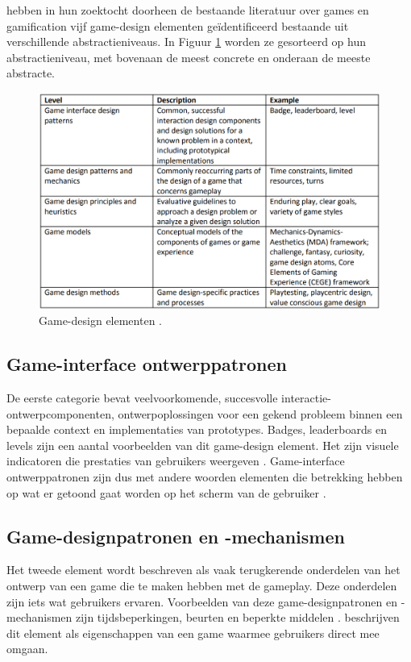 \textcite{Deterding20112} hebben in hun zoektocht doorheen de bestaande literatuur over games en gamification vijf game-design elementen geïdentificeerd bestaande uit verschillende abstractieniveaus. In Figuur \ref{fig:table1} worden ze gesorteerd op hun abstractieniveau, met bovenaan de meest concrete en onderaan de meeste abstracte.

\begin{figure}
    \includegraphics[width=\linewidth]{Deterding2011Table.png}
    \caption{Game-design elementen \autocite{Deterding20112}.}
    \label{fig:table1}
\end{figure}

\subsection{Game-interface ontwerppatronen}

De eerste categorie bevat veelvoorkomende, succesvolle interactie-ontwerpcomponenten, ontwerpoplossingen voor een gekend probleem binnen een bepaalde context en implementaties van prototypes. Badges, leaderboards en levels zijn een aantal voorbeelden van dit game-design element. Het zijn visuele indicatoren die prestaties van gebruikers weergeven \autocite{Morford2014}. Game-interface ontwerppatronen zijn dus met andere woorden elementen die betrekking hebben op wat er getoond gaat worden op het scherm van de gebruiker \autocite{Lindholm2016}.

\subsection{Game-designpatronen en -mechanismen}

Het tweede element wordt beschreven als vaak terugkerende onderdelen van het ontwerp van een game die te maken hebben met de gameplay. Deze onderdelen zijn iets wat gebruikers ervaren. Voorbeelden van deze game-designpatronen en -mechanismen zijn tijdsbeperkingen, beurten en beperkte middelen \autocite{Lindholm2016}. \textcite{Morford2014} beschrijven dit element als eigenschappen van een game waarmee gebruikers direct mee omgaan.

